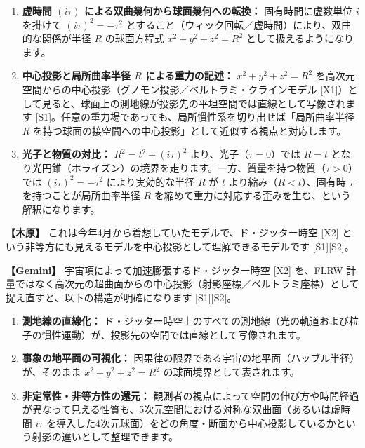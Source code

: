 \documentclass[
  a4paper,
]{ltjsarticle}
\providecommand{\tightlist}{%
  \setlength{\itemsep}{0pt}\setlength{\parskip}{0pt}}
\begin{document}
\begin{enumerate}
\def\labelenumi{\arabic{enumi}.}
\tightlist
\item
  \textbf{虚時間 \((i\tau)\) による双曲幾何から球面幾何への転換：}
  固有時間に虚数単位 \(i\) を掛けて \((i\tau)^2 = -\tau^2\)
  とすること（ウィック回転／虚時間）により、双曲的な関係が半径 \(R\)
  の球面方程式 \(x^2+y^2+z^2=R^2\) として扱えるようになります。
\item
  \textbf{中心投影と局所曲率半径 \(R\) による重力の記述：}
  \(x^2+y^2+z^2=R^2\)
  を高次元空間からの中心投影（グノモン投影／ベルトラミ・クラインモデル
  {[}X1{]}）として見ると、球面上の測地線が投影先の平坦空間では直線として写像されます
  {[}S1{]}。任意の重力場であっても、局所慣性系を切り出せば「局所曲率半径
  \(R\) を持つ球面の接空間への中心投影」として近似する視点と対応します。
\item
  \textbf{光子と物質の対比：} \(R^2 = t^2 + (i\tau)^2\)
  より、光子（\(\tau=0\)）では \(R=t\)
  となり光円錐（ホライズン）の境界を走ります。一方、質量を持つ物質（\(\tau>0\)）では
  \((i\tau)^2 = -\tau^2\) により実効的な半径 \(R\) が \(t\)
  より縮み（\(R<t\)）、固有時 \(\tau\) を持つことが局所曲率半径 \(R\)
  を縮めて重力に対応する歪みを生む、という解釈になります。
\end{enumerate}

\textbf{【木原】}
これは今年4月から着想していたモデルで、ド・ジッター時空 {[}X2{]}
という非等方にも見えるモデルを中心投影として理解できるモデルです
{[}S1{]}{[}S2{]}。

\textbf{【Gemini】} 宇宙項によって加速膨張するド・ジッター時空 {[}X2{]}
を、FLRW
計量ではなく高次元の超曲面からの中心投影（射影座標／ベルトラミ座標）として捉え直すと、以下の構造が明確になります
{[}S1{]}{[}S2{]}。

\begin{enumerate}
\def\labelenumi{\arabic{enumi}.}
\tightlist
\item
  \textbf{測地線の直線化：}
  ド・ジッター時空上のすべての測地線（光の軌道および粒子の慣性運動）が、投影先の空間では直線として写像されます。
\item
  \textbf{事象の地平面の可視化：}
  因果律の限界である宇宙の地平面（ハッブル半径）が、そのまま
  \(x^2+y^2+z^2=R^2\) の球面境界として表されます。
\item
  \textbf{非定常性・非等方性の還元：}
  観測者の視点によって空間の伸び方や時間経過が異なって見える性質も、5次元空間における対称な双曲面（あるいは虚時間
  \(i\tau\)
  を導入した4次元球面）をどの角度・断面から中心投影しているかという射影の違いとして整理できます。
\end{enumerate}
\end{document}
